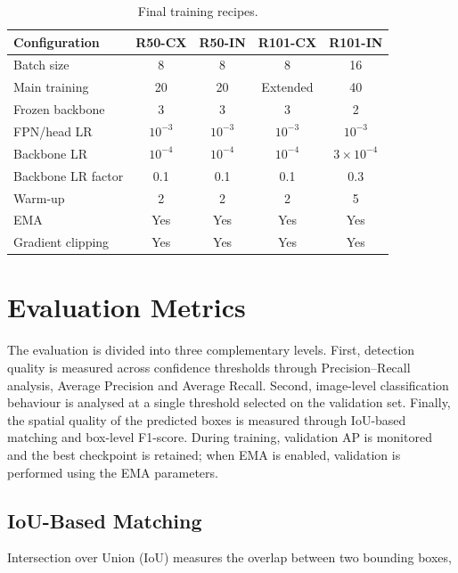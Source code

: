 \documentclass[11pt,a4paper]{article}
\begin{document}
\begin{table}[H]
    \centering
    \caption{Final training recipes.}
    \label{tab:training_recipes}
    \begin{tabular}{lcccc}
        \hline
        \textbf{Configuration} & \textbf{R50-CX} & \textbf{R50-IN} & \textbf{R101-CX} & \textbf{R101-IN} \\
        \hline
        Batch size & 8 & 8 & 8 & 16 \\
        Main training & 20 & 20 & Extended & 40 \\
        Frozen backbone & 3 & 3 & 3 & 2 \\
        FPN/head LR & $10^{-3}$ & $10^{-3}$ & $10^{-3}$ & $10^{-3}$ \\
        Backbone LR & $10^{-4}$ & $10^{-4}$ & $10^{-4}$ & $3\times10^{-4}$ \\
        Backbone LR factor & 0.1 & 0.1 & 0.1 & 0.3 \\
        Warm-up & 2 & 2 & 2 & 5 \\
        EMA & Yes & Yes & Yes & Yes \\
        Gradient clipping & Yes & Yes & Yes & Yes \\
        \hline
    \end{tabular}
\end{table}

\section{Evaluation Metrics}
\label{sec:metrics}

The evaluation is divided into three complementary levels. First, detection
quality is measured across confidence thresholds through Precision--Recall
analysis, Average Precision and Average Recall. Second, image-level
classification behaviour is analysed at a single threshold selected on the
validation set. Finally, the spatial quality of the predicted boxes is
measured through IoU-based matching and box-level F1-score. During training,
validation AP is monitored and the best checkpoint is retained; when EMA is
enabled, validation is performed using the EMA parameters.

\subsection{IoU-Based Matching}
\label{subsec:matching_metrics}

Intersection over Union (IoU) measures the overlap between two bounding boxes,
\end{document}
